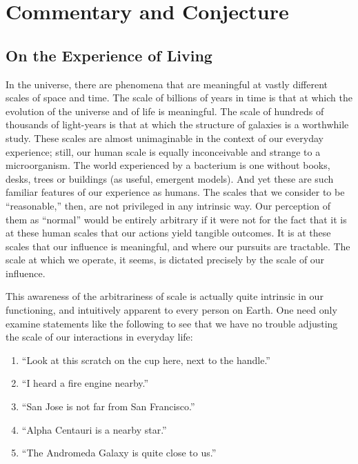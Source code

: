\documentclass[pra,twocolumn,groupedaddress,10pt]{revtex4}
\theoremstyle{definition}
\begin{document}

\section{Commentary and Conjecture} \label{sec:comcon}

\subsection{On the Experience of Living} \label{sec:expliv}

In the universe, there are phenomena that are meaningful at vastly different scales of space and time. The scale of billions of years in time is that at which the evolution of the universe and of life is meaningful. The scale of hundreds of thousands of light-years is that at which the structure of galaxies is a worthwhile study. These scales are almost unimaginable in the context of our everyday experience; still, our human scale is equally inconceivable and strange to a microorganism. The world experienced by a bacterium is one without books, desks, trees or buildings (as useful, emergent models). And yet these are such familiar features of our experience as humans. The scales that we consider to be ``reasonable,'' then, are not privileged in any intrinsic way. Our perception of them as ``normal'' would be entirely arbitrary if it were not for the fact that it is at these human scales that our actions yield tangible outcomes. It is at these scales that our influence is meaningful, and where our pursuits are tractable. The scale at which we operate, it seems, is dictated precisely by the scale of our influence.

This awareness of the arbitrariness of scale is actually quite intrinsic in our functioning, and intuitively apparent to every person on Earth. One need only examine statements like the following to see that we have no trouble adjusting the scale of our interactions in everyday life:

\begin{enumerate}
	\item ``Look at this scratch on the cup here, next to the handle.''
	\item ``I heard a fire engine nearby.''
	\item ``San Jose is not far from San Francisco.''
	\item ``Alpha Centauri is a nearby star.''
	\item ``The Andromeda Galaxy is quite close to us.''
\end{enumerate}
\end{document}
